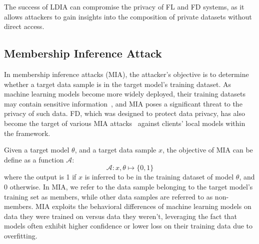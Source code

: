 The success of LDIA can compromise the privacy of FL and FD systems, as it allows attackers to gain insights into the composition of private datasets without direct access.


\subsection{Membership Inference Attack}
In membership inference attacks (MIA), the attacker's objective is to determine whether a target data sample is in the target model's training dataset.
As machine learning models become more widely deployed, their training datasets may contain sensitive information~\cite{havaei2017brain, fu2016credit}, and MIA poses a significant threat to the privacy of such data.
FD, which was designed to protect data privacy, has also become the target of various MIA attacks~\cite{yang2022fd, wang2024graddiff} against clients' local models within the framework.

 Given a target model $\theta$, and a target data sample $x$, the objective of MIA can be define as a function $\mathcal{A}$:
\begin{equation}
    \mathcal{A} : x, \theta \mapsto \{ 0, 1\}
\end{equation}
where the output is 1 if $x$ is inferred to be in the training dataset of model $\theta$, and 0 otherwise. 
In MIA, we refer to the data sample belonging to the target model's training set as members, while other data samples are referred to as non-members.
MIA exploits the behavioral differences of machine learning models on data they were trained on versus data they weren't, leveraging the fact that models often exhibit higher confidence or lower loss on their training data due to overfitting.

\iffalse
Yeom \etal~\cite{yeom2018privacy} proposed using the target sample's loss value on the target model as the membership score to determine whether the sample is a member. 
Typically, members exhibit lower loss values on the target model, while non-members tend to have relatively higher loss values. 
To enhance the precision of MIA, some approaches~\cite{carlini2022membership, watson2021importance} have introduced difficulty calibration. 
In this type of MIA, attackers possess an auxiliary dataset with the same data distribution as the target model's training dataset, which they use to train a reference model.
They achieve more precise MIA by exploiting the difference in membership scores between members and non-members on both the target model and the reference model. 
Since members are in the target model's training set but not in the reference model's, there is a significant difference in their membership scores between the two models. 
In contrast, non-members, as they are not in the training sets of either model, tend to have similar membership scores across the target model and the reference model. 
These membership scores can be based on confidence scores or loss values of the target data sample on the models.
\fi
